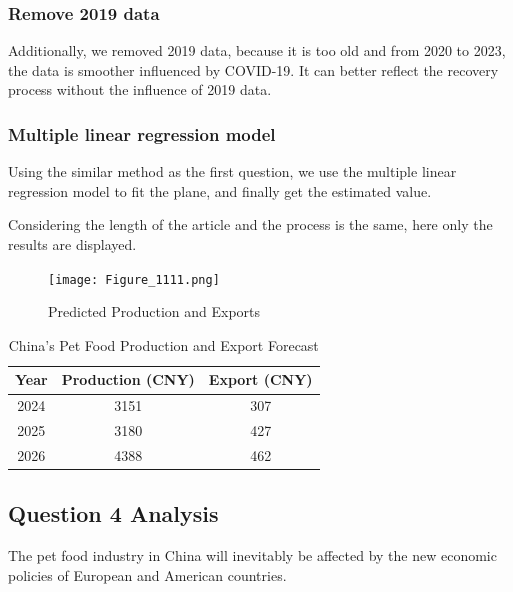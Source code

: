 \documentclass[withoutpreface,bwprint]{cumcmthesis} %
\begin{document}
\subsubsection{Remove 2019 data}
\par Additionally, we removed 2019 data, because it is too old and from 2020 to 2023, the data is smoother influenced by COVID-19.
It can better reflect the recovery process without the influence of 2019 data.
\subsubsection{Multiple linear regression model}
\par Using the similar method as the first question, we use the multiple linear regression model to fit the plane, and finally get the estimated value.
\par Considering the length of the article and the process is the same, here only the results are displayed.
\begin{figure}[htbp]
	\centering
	\texttt{[image: Figure\_1111.png]}
	\caption{Predicted Production and Exports}
\end{figure}
\begin{table}[htbp]
\centering
\caption{China's Pet Food Production and Export Forecast}
\begin{tabular}{ccc}
\toprule
Year & Production (CNY) & Export (CNY) \\
\midrule
2024 & 3151 & 307 \\
2025 & 3180 & 427 \\
2026 & 4388 & 462 \\
\bottomrule
\end{tabular}
\end{table}
\subsection{Question 4 Analysis}
\par The pet food industry in China will inevitably be affected by the new economic policies of European and American countries.
\end{document}
